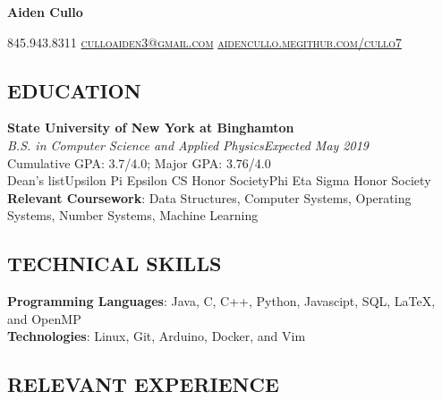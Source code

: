 \documentclass[10pt]{article}
\begin{document}
\centerline{\Huge \textbf{Aiden Cullo}}
\vspace{1.5mm}

\centerline{\textsc{845.943.8311 \sbar\href{mailto:culloaiden3@gmail.com}{culloaiden3@gmail.com} \sbar \href{http://aidencullo.me}{aidencullo.me}\sbar\href{https://github.com/cullo7}{github.com/cullo7}}}
\vspace{-1mm}
\subsection*{EDUCATION}

\spacedhrule{-0.1em}{0.5em}
\textbf{State University of New York at Binghamton} \\ 
\textit{B.S. in Computer Science and Applied Physics}\hfill \textit{Expected May 2019}\\
Cumulative GPA: 3.7/4.0;  Major GPA: 3.76/4.0\\
Dean's list\sbull Upsilon Pi Epsilon CS Honor Society\sbull Phi Eta Sigma Honor Society \\ 
\textbf{Relevant Coursework}: Data Structures, Computer Systems, Operating Systems, Number Systems, Machine Learning

\subsecspace
\subsection*{TECHNICAL SKILLS}
\spacedhrule{-0.1em}{0.5em}
\textbf{Programming Languages}: Java, C, C++, Python, Javascipt, SQL, \LaTeX, and OpenMP\\
\textbf{Technologies}: Linux, Git, Arduino, Docker, and Vim
\subsecspace
\subsection*{RELEVANT EXPERIENCE}
\spacedhrule{-0.1em}{0.5em}
\end{document}
